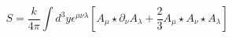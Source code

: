 \begin{equation}
S=\frac{k}{4\pi} \int d^3y  \epsilon^{\mu \nu \lambda}
\left[
A_{\mu} \star \partial_{\nu} A_{\lambda}
+\frac{2}{3} A_{\mu} \star   A_{\nu} \star   A_{\lambda}
\right]
\end{equation}

